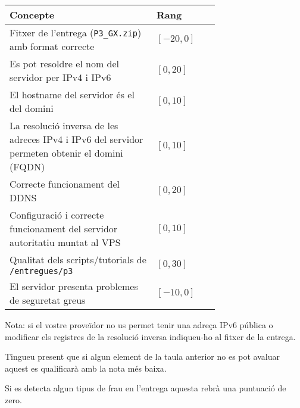 \documentclass{practicaitic}
\begin{document}
\begin{center}%
  \begin{tabular}{p{0.7\linewidth} l}
  \hline
  Concepte & Rang \\ \hline
  Fitxer de l'entrega (\texttt{P3\_GX.zip}) amb format correcte & $[-20, 0]$ \\
  Es pot resoldre el nom del servidor per IPv4 i IPv6 & $[0, 20]$ \\
  El hostname del servidor és el del domini & $[0, 10]$ \\
  La resolució inversa de les adreces IPv4 i IPv6 del servidor permeten obtenir el domini (FQDN) & $[0, 10]$ \\
  Correcte funcionament del DDNS & $[0, 20]$ \\
  Configuració i correcte funcionament del servidor autoritatiu muntat al VPS & $[0, 10]$ \\
  Qualitat dels scripts/tutorials de \texttt{/entregues/p3} & $[0,30]$ \\
  El servidor presenta problemes de seguretat greus & $[-10,0]$ \\
  \hline
  \end{tabular}
\end{center}

Nota: si el vostre proveïdor no us permet tenir una adreça IPv6 pública o
modificar els registres de la resolució inversa indiqueu-ho al fitxer de la
entrega.

Tingueu present que si algun element de la taula anterior no es pot avaluar
aquest es qualificarà amb la nota més baixa.

Si es detecta algun tipus de frau en l'entrega aquesta rebrà una puntuació de zero.
\end{document}
